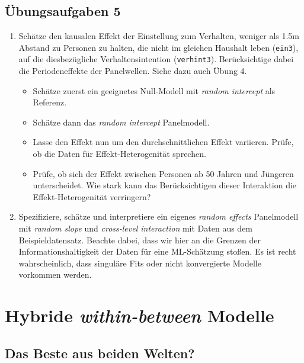 \documentclass[
]{book}
\providecommand{\tightlist}{%
  \setlength{\itemsep}{0pt}\setlength{\parskip}{0pt}}
\begin{document}
\hypertarget{uxfcbungsaufgaben-5}{%
\section{Übungsaufgaben 5}\label{uxfcbungsaufgaben-5}}

\begin{enumerate}
\def\labelenumi{\arabic{enumi})}
\tightlist
\item
  Schätze den kausalen Effekt der Einstellung zum Verhalten, weniger als 1.5m Abstand zu Personen zu halten, die nicht im gleichen Haushalt leben (\texttt{ein3}), auf die diesbezügliche Verhaltensintention (\texttt{verhint3}). Berücksichtige dabei die Periodeneffekte der Panelwellen. Siehe dazu auch Übung 4.

  \begin{itemize}
  \tightlist
  \item
    Schätze zuerst ein geeignetes Null-Modell mit \emph{random intercept} als Referenz.
  \item
    Schätze dann das \emph{random intercept} Panelmodell.
  \item
    Lasse den Effekt nun um den durchschnittlichen Effekt variieren. Prüfe, ob die Daten für Effekt-Heterogenität sprechen.
  \item
    Prüfe, ob sich der Effekt zwischen Personen ab 50 Jahren und Jüngeren unterscheidet. Wie stark kann das Berücksichtigen dieser Interaktion die Effekt-Heterogenität verringern?
  \end{itemize}
\item
  Spezifiziere, schätze und interpretiere ein eigenes \emph{random effects} Panelmodell mit \emph{random slope} und \emph{cross-level interaction} mit Daten aus dem Beispieldatensatz. Beachte dabei, dass wir hier an die Grenzen der Informationshaltigkeit der Daten für eine ML-Schätzung stoßen. Es ist recht wahrscheinlich, dass singuläre Fits oder nicht konvergierte Modelle vorkommen werden.
\end{enumerate}

\hypertarget{hybride-within-between-modelle}{%
\chapter{\texorpdfstring{Hybride \emph{within-between} Modelle}{Hybride within-between Modelle}}\label{hybride-within-between-modelle}}

\hypertarget{das-beste-aus-beiden-welten}{%
\section{Das Beste aus beiden Welten?}\label{das-beste-aus-beiden-welten}}
\end{document}
